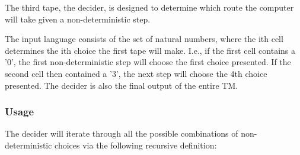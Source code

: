 \documentclass{report}
\begin{document}
The third tape, the decider, is designed to determine which route the computer will take given a non-deterministic step.

The input language consists of the set of natural numbers, where the ith cell determines the ith choice the first tape will make. I.e., if the first cell contains a '0', the first non-deterministic step will choose the first choice presented. If the second cell then contained a '3', the next step will choose the 4th choice presented.
The decider is also the final output of the entire TM.

\subsubsection{Usage}

The decider will iterate through all the possible combinations of non-deterministic choices via the following recursive definition:
\end{document}
